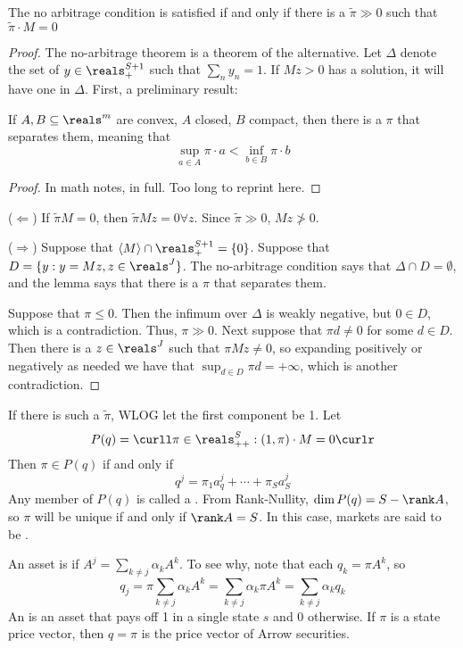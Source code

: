 \documentclass[10pt]{article}
\begin{document}
\begin{theorem}
	The no arbitrage condition is satisfied if and only if there is a $\tilde{\pi} \gg 0$ such that $\tilde{\pi}\cdot M = 0$
\end{theorem}
\begin{proof}
	The no-arbitrage theorem is a theorem of the alternative. Let $\Delta$ denote the set of $y \in \reals^{S+1}_+$ such that $\sum_n y_n = 1$. If $Mz > 0$ has a solution, it will have one in $\Delta$. First, a preliminary result:
	\begin{lemma}
		If $A,B \subseteq \reals^m$ are convex, $A$ closed, $B$ compact, then there is a $\pi$ that separates them, meaning that \[\sup_{a\in A} \pi \cdot a < \inf_{b\in B} \pi \cdot b\]
	\end{lemma}
	\begin{proof} In math notes, in full. Too long to reprint here.
	 \end{proof}
	 
	 ($\Leftarrow$) If $\tilde{\pi}M = 0$, then $\tilde{\pi}Mz = 0 \forall z$. Since $\tilde{\pi} \gg 0$, $Mz \not> 0$. 
	 
	 ($\Rightarrow$) Suppose that $\langle M \rangle \cap \reals^{S+1}_+ = \{0\}$. Suppose that $D = \{y : y = Mz, z \in \reals^J\}$. The no-arbitrage condition says that $\Delta \cap D = \emptyset$, and the lemma says that there is a $\pi$ that separates them. 
	 
	 Suppose that $\pi \le 0$. Then the infimum over $\Delta$ is weakly negative, but $0 \in D$, which is a contradiction. Thus, $\pi \gg 0$. Next suppose that $\pi d \ne 0$ for some $d \in D$. Then there is a $z \in \reals^J$ such that $\pi M z \ne 0$, so expanding positively or negatively as needed we have that $\sup_{d\in D} \pi d = +\infty$, which is another contradiction.
\end{proof}



\begin{remark}
	If there is such a $\tilde{\pi}$, WLOG let the first component be 1. Let\[P(q) = \curll \pi \in \reals^S_{++} : (1,\pi)\cdot M = 0\curlr\]Then $\pi \in P(q)$ if and only if\[q^j = \pi_1a_q^j + \cdots + \pi_Sa^j_S\]Any member of $P(q)$ is called a . From Rank-Nullity, $\dim P(q) = S - \rank A$, so $\pi$ will be unique if and only if $\rank A = S$. In this case, markets are said to be . 
\end{remark}

\begin{definition}
	An asset is  if $A^j = \sum_{k\ne j} \alpha_k A^k$. To see why, note that each $q_k = \pi A^k$, so\[q_j = \pi \sum_{k\ne j} \alpha_k A^k = \sum_{k\ne j} \alpha_k \pi A^k = \sum_{k \ne j} \alpha_k q_k\]An  is an asset that pays off 1 in a single state $s$ and 0 otherwise. If $\pi$ is a state price vector, then $q = \pi$ is the price vector of Arrow securities.
\end{definition}
\end{document}
